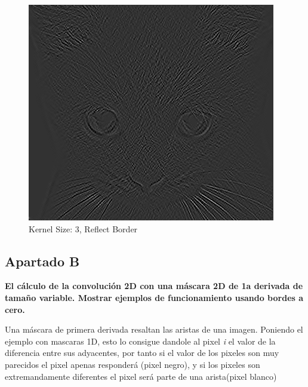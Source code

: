 \documentclass{article}
\begin{document}
\begin{minipage}{\linewidth}
    \centering
    \begin{minipage}{0.45\linewidth}
        \begin{figure}[H]
			\includegraphics[width=\linewidth]{Ejercicio2a/cat(3,3)_REFLECT.png}             
			\caption{Kernel Size: 3,  Reflect Border}
        \end{figure}
    \end{minipage}   
\end{minipage}

\subsection*{Apartado B}
\textbf{El cálculo de la convolución 2D con una máscara 2D de 1a derivada de tamaño variable. Mostrar ejemplos de funcionamiento usando bordes a cero.}

Una máscara de primera derivada resaltan las aristas de una imagen. Poniendo el ejemplo con mascaras 1D, esto lo consigue dandole al pixel \textit{i} el valor de la diferencia entre sus adyacentes, por tanto si el valor de los pixeles son muy parecidos el pixel apenas responderá (pixel negro), y si los pixeles son extremandamente diferentes el pixel será parte de una arista(pixel blanco)
\end{document}
